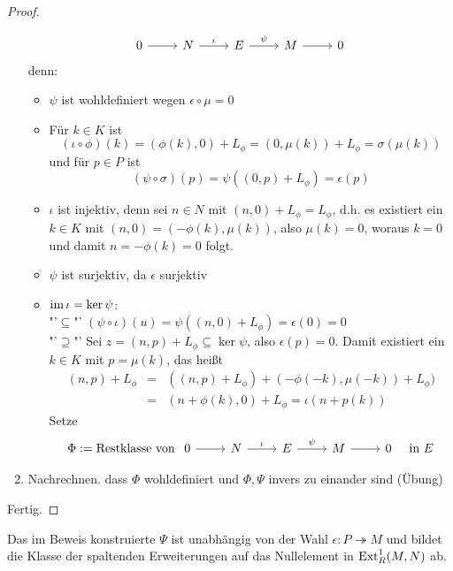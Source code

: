 \begin{proof}
\begin{enumerate}
$$\begin{tikzcd}
		0 \arrow{r} & N \arrow{r}{\iota} & E \arrow{r}{\psi} & M \arrow{r} & 0
		\end{tikzcd}$$
		denn:
		\begin{itemize}
			\item $\psi$ ist wohldefiniert wegen $\epsilon \circ \mu =0$
			\item Für $k\in K$ ist 
			$$(\iota \circ \phi)(k) = (\phi(k), 0) + L_\phi = (0, \mu(k)) + L_\phi = \sigma(\mu(k))$$
			und für $p\in P$ ist 
			$$(\psi\circ \sigma)(p) = \psi((0,p) + L_\phi) = \epsilon(p)$$
			\item $\iota$ ist injektiv, denn sei $n\in N$ mit $(n,0) + L_\phi = L_\phi$, d.h. es existiert ein $k\in K$ mit $(n,0) = (-\phi(k), \mu(k))$, also $\mu(k) =0$, woraus $k=0$ und damit $n= -\phi(k) = 0$ folgt.
			\item $\psi$ ist surjektiv, da $\epsilon$ surjektiv
			\item $\operatorname{im} \iota = \ker \psi$:\\
			"'$\subseteq$"' $(\psi \circ \iota)(u) = \psi((n,0) + L_\phi)= \epsilon(0) =0$\\
			"'$\supseteq$"' Sei $z=(n,p) + L_\phi\subseteq \ker \psi$, also $\epsilon(p) = 0$. Damit existiert ein $k\in K$ mit $p = \mu(k)$, das heißt 
			\begin{eqnarray*}
				(n,p) + L_\phi &=& ((n,p) + L_\phi) + (-\phi(-k), \mu(-k)) + L_\phi)\\
				&=& (n+ \phi(k) , 0) + L_\phi= \iota(n+p(k))
			\end{eqnarray*}
		Setze 
		$$\Phi:= \text{Restklasse von } \begin{tikzcd}
		0 \arrow{r} & N \arrow{r}{\iota} & E \arrow{r}{\psi} & M \arrow{r} & 0 
		\end{tikzcd} \quad \text{in }E$$
		\end{itemize}
	\item Nachrechnen. dass $\Phi$ wohldefiniert und $\Phi, \Psi$ invers zu einander sind (Übung)
	\end{enumerate}
	Fertig.
\end{proof}
\begin{anm}
	Das im Beweis konstruierte $\Psi$ ist unabhängig von der Wahl $\epsilon:P \twoheadrightarrow M$ und bildet die Klasse der spaltenden Erweiterungen auf das Nullelement in $\text{Ext}_R^1(M,N)$ ab.
\end{anm}

